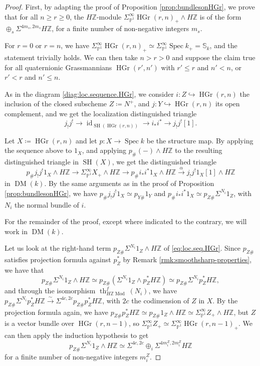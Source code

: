 \documentclass[10pt]{amsart}
\theoremstyle{definition}
\theoremstyle{plain}
\numberwithin{equation}{section}
\newcommand{\0}{\emptyset}
\renewcommand{\P}{{\mathbb P}}
\newcommand{\Z}{{\mathbb Z}}
\newcommand{\HGr}{{\operatorname{HGr}}}
\newcommand{\Spec}{{\operatorname{Spec}}}
\newcommand{\SH}{{\operatorname{SH}}}
\newcommand{\DM}{{\operatorname{DM}}}
\renewcommand{\th}{{\operatorname{th}}}
\newcommand{\Mod}{{\operatorname{Mod}}}
\newcommand{\id}{{\operatorname{id}}}
\begin{document}
\begin{proof}
    First, by adapting the proof of Proposition \ref{prop:bundlesonHGr}, we prove that for all $n \ge r \ge 0$, the $H\Z$-module $\Sigma^\infty_{\P^1} \HGr(r,n)_+ \wedge H\Z$ is of the form $\oplus_s \Sigma^{4m_s,2m_s}H\Z$, for a finite number of non-negative integers $m_s$. 

    For $r=0$ or $r=n$, we have $\Sigma^\infty_{\P^1} \HGr(r,n)_+\simeq \Sigma^\infty_{\P^1}\Spec k_+=\mathbb{S}_k$, and the statement trivially holds. We can then take $n>r>0$ and suppose the claim true for all quaternionic Grassmannians $\HGr(r',n')$ with $r'\le r$ and $n'<n$, or $r'<r$ and $n'\le n$. 

    As in the diagram \eqref{diag:loc.sequence.HGr}, we consider $i:Z \hookrightarrow \HGr(r,n)$ the inclusion of the closed subscheme $Z \coloneqq N^+$, and $j:Y \hookrightarrow \HGr(r,n)$ its open complement, and we get the localization distinguished triangle
    \begin{equation*}
        j_!j^! \to \id_{\SH(\HGr(r,n))} \to i_*i^* \to j_!j^![1].
    \end{equation*}

    Let $X\coloneqq \HGr(r,n)$ and let $p:X \to \Spec k$ be the structure map. By applying the sequence above to $1_X$, and applying $p_\#(-)\wedge H\Z$ to the resulting distinguished triangle in $\SH(X)$, we get the distinguished triangle
    \begin{equation}
        \label{eq:loc.seq.HGr}
        p_\#j_!j^!1_X \wedge H\Z \to \Sigma^\infty_{\P^1}X_+ \wedge H\Z \to p_\# i_*i^*1_X \wedge H\Z \xrightarrow{\alpha} j_!j^!1_X[1] \wedge H\Z
    \end{equation}
    in $\DM(k)$. By the same arguments as in the proof of Proposition \ref{prop:bundlesonHGr}, we have $p_\#j_!j^!1_X \simeq p_{Y\#}1_Y$ and $p_\#i_*i^*1_X \simeq p_{Z\#}\Sigma^{N_i}1_Z$, with $N_i$ the normal bundle of $i$.
    
    For the remainder of the proof, except where indicated to the contrary, we will work in $\DM(k)$.

  Let us look at the right-hand term $p_{Z\#}\Sigma^{N_i}1_Z \wedge H\Z$ of \eqref{eq:loc.seq.HGr}. Since $p_{Z\#}$ satisfies projection formula against $p_Z^*$ by Remark \ref{rmk:smoothsharp-properties}, we have that $$p_{Z\#}\Sigma^{N_i}1_Z \wedge H\Z \simeq p_{Z\#}(\Sigma^{N_i}1_Z \wedge p_Z^*H\Z) \simeq p_{Z\#}\Sigma^{N_i}p_Z^*H\Z,$$
    and through the isomorphism $\th^f_{H\Z \Mod}(N_i)$, we have $p_{Z\#}\Sigma^{N_i}p_Z^*H\Z \xrightarrow{\sim} \Sigma^{4c,2c}p_{Z\#}p_Z^*H\Z$, with $2c$ the codimension of $Z$ in $X$. By the projection formula again, we have $p_{Z\#}p_Z^*H\Z \simeq p_{Z\#}1_Z \wedge H\Z \simeq \Sigma_{\P^1}^\infty Z_+\wedge H\Z$, but $Z$ is a vector bundle over $\HGr(r,n-1)$, so $\Sigma_{\P^1}^\infty Z_+ \simeq \Sigma_{\P^1}^\infty \HGr(r,n-1)_+$. We can then apply the induction hypothesis to get
    $$p_{Z\#}\Sigma^{N_i}1_Z \wedge H\Z\simeq \Sigma^{4c,2c}\oplus_i \Sigma^{4m_i^Z,2m_i^Z}H\Z$$
    for a finite number of non-negative integers $m_i^Z$.


\end{proof}
\end{document}
